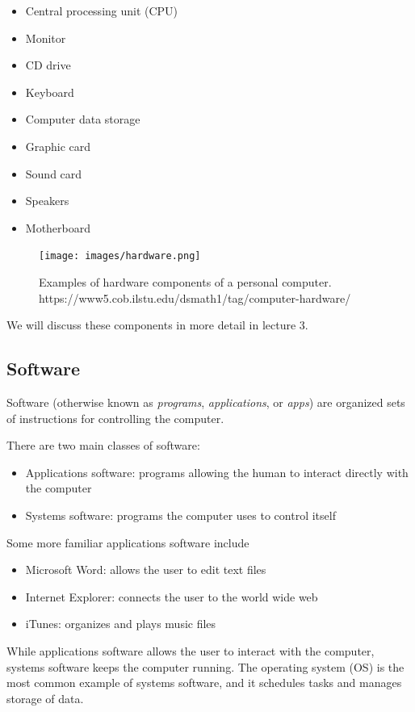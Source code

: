 \begin{itemize}
	\item Central processing unit (CPU)
	\item Monitor
	\item CD drive
	\item Keyboard
	\item Computer data storage
	\item Graphic card
	\item Sound card
	\item Speakers
	\item Motherboard
\end{itemize}

\begin{figure}
	\centering
	\texttt{[image: images/hardware.png]}
	\caption{Examples of hardware components of a personal computer. https://www5.cob.ilstu.edu/dsmath1/tag/computer-hardware/}
	\label{fig:hardware}
\end{figure}

We will discuss these components in more detail in lecture 3.

\subsection{Software}

Software (otherwise known as \textit{programs}, \textit{applications}, or \textit{apps}) are organized sets of instructions for controlling the computer.

There are two main classes of software:

\begin{itemize}
	\item Applications software: programs allowing the human to interact directly with the computer
	\item Systems software: programs the computer uses to control itself
\end{itemize}

Some more familiar applications software include

\begin{itemize}
	\item Microsoft Word: allows the user to edit text files
	\item Internet Explorer: connects the user to the world wide web
	\item iTunes: organizes and plays music files
\end{itemize}

While applications software allows the user to interact with the computer, systems software keeps the computer running. The operating system (OS) is the most common example of systems software, and it schedules tasks and manages storage of data.

